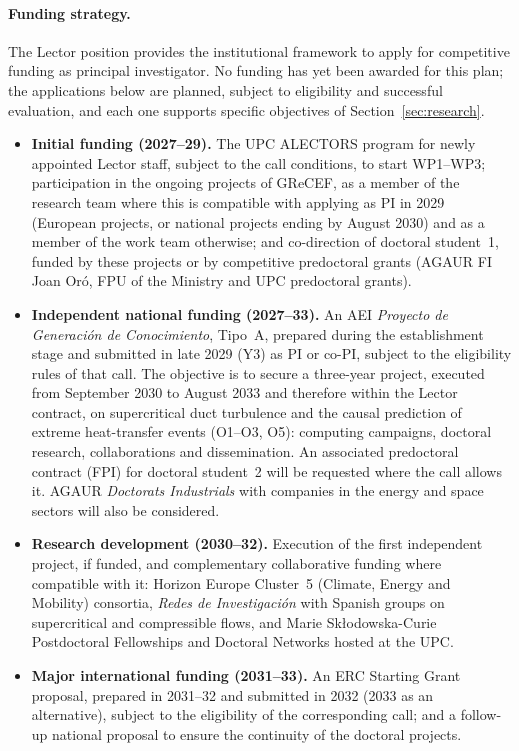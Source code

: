 \documentclass[11pt]{article}
\begin{document}
\paragraph{Funding strategy.} The Lector position provides the institutional framework to
apply for competitive funding as principal investigator. No funding has yet been awarded for
this plan; the applications below are planned, subject to eligibility and successful
evaluation, and each one supports specific objectives of Section~\ref{sec:research}.
\begin{itemize}
  \item \textbf{Initial funding (2027--29).} The UPC ALECTORS program for newly appointed
  Lector staff, subject to the call conditions, to start WP1--WP3; participation in the ongoing
  projects of GReCEF, as a member of the research team where this is compatible with applying as
  PI in 2029 (European projects, or national projects ending by August 2030) and as a member of
  the work team otherwise; and co-direction of doctoral student~1, funded by these projects or by
  competitive predoctoral grants (AGAUR FI Joan Or\'o, FPU of the Ministry and UPC predoctoral grants).
  \item \textbf{Independent national funding (2027--33).} An AEI \emph{Proyecto de
  Generaci\'on de Conocimiento}, Tipo~A, prepared during the establishment stage and submitted in
  late 2029 (Y3) as PI or co-PI, subject to the eligibility rules of that call. The objective is to
  secure a three-year project, executed from September 2030 to August 2033 and therefore within
  the Lector contract, on supercritical duct turbulence and
  the causal prediction of extreme heat-transfer events (O1--O3, O5): computing campaigns,
  doctoral research, collaborations and dissemination. An associated predoctoral contract
  (FPI) for doctoral student~2 will be requested where the call allows it. AGAUR
  \emph{Doctorats Industrials} with companies in the energy and space sectors will also be
  considered.
  \item \textbf{Research development (2030--32).} Execution of the first independent project,
  if funded, and complementary collaborative funding where compatible with it: Horizon
  Europe Cluster~5 (Climate, Energy and Mobility) consortia, \emph{Redes de Investigaci\'on}
  with Spanish groups on supercritical and compressible flows, and Marie
  Sk\l{}odowska-Curie Postdoctoral Fellowships and Doctoral Networks hosted at the UPC.
  \item \textbf{Major international funding (2031--33).} An ERC Starting Grant proposal,
  prepared in 2031--32 and submitted in 2032 (2033 as an alternative), subject to the
  eligibility of the corresponding call; and a follow-up national proposal to ensure the
  continuity of the doctoral projects.
\end{itemize}
\end{document}
